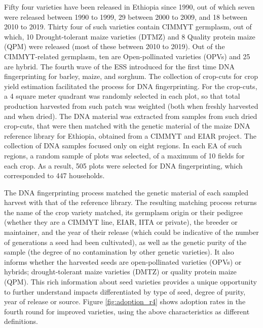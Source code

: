 \documentclass{article}
\begin{document}
Fifty four varieties have been released in Ethiopia since 1990, out of which seven were released between 1990 to 1999, 29 between 2000 to 2009, and 18 between 2010 to 2019. Thirty four of such varieties contain CIMMYT germplasm, out of which, 10 Drought-tolerant maize varieties (DTMZ) and 8 Quality protein maize (QPM) were released (most of these between 2010 to 2019). Out of the CIMMYT-related germplasm, ten are Open-pollinated varieties (OPVs) and 25 are hybrid. 
The fourth wave of the ESS introduced for the first time DNA fingerprinting for barley, maize, and sorghum. The collection of crop-cuts for crop yield estimation facilitated the process for DNA fingerprinting. For the crop-cuts, a 4 square meter quadrant was randomly selected in each plot, so that total production harvested from such patch was weighted (both when freshly harvested and when dried). The DNA material was extracted from samples from such dried crop-cuts, that were then matched with the genetic material of the maize DNA reference library for Ethiopia, obtained from a CIMMYT and EIAR project. The collection of DNA samples focused only on eight regions. In each EA of such regions, a random sample of plots was selected, of a maximum of 10 fields for each crop. As a result, 505 plots were selected for DNA fingerprinting, which corresponded to 447 households. 

The DNA fingerprinting process matched the genetic material of each sampled harvest with that of the reference library. The resulting matching process returns the name of the crop variety matched, its germplasm origin or their pedigree (whether they are a CIMMYT line, EIAR, IITA or private), the breeder or maintainer, and the year of their release (which could be indicative of the number of generations a seed had been cultivated), as well as the genetic purity of the sample (the degree of no contamination by other genetic varieties). It also informs whether the harvested seeds are open-pollinated varieties (OPVs) or hybrids; drought-tolerant maize varieties (DMTZ) or quality protein maize (QPM). This rich information about seed varieties provides a unique opportunity to further understand impacts differentiated by type of seed, degree of purity, year of release or source. Figure \ref{fig:adoption_r4} shows adoption rates in the fourth round for improved varieties, using the above characteristics as different definitions.
\end{document}
